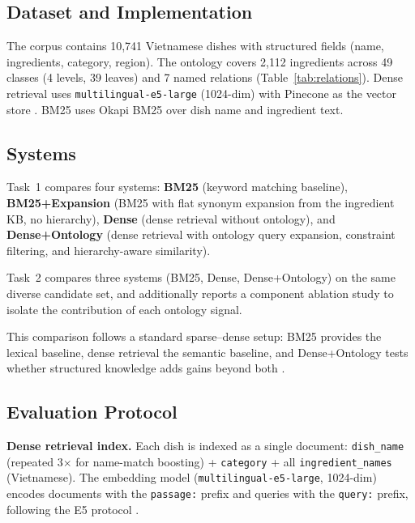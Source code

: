 \label{sec:experiments}

\subsection{Dataset and Implementation}

The corpus contains 10{,}741 Vietnamese dishes with structured fields (name, ingredients, category, region). The ontology covers 2{,}112 ingredients across 49 classes (4 levels, 39 leaves) and 7 named relations (Table~\ref{tab:relations}). Dense retrieval uses \texttt{multilingual-e5-large} (1024-dim) with Pinecone as the vector store \cite{wang2024multilinguale5}. BM25 uses Okapi BM25 over dish name and ingredient text.

\subsection{Systems}

Task~1 compares four systems: \textbf{BM25} (keyword matching 
baseline), \textbf{BM25+Expansion} (BM25 with flat synonym expansion from the ingredient KB, no hierarchy), \textbf{Dense} (dense retrieval without ontology), and \textbf{Dense+Ontology} 
(dense retrieval with ontology query expansion, constraint filtering, and hierarchy-aware similarity). 

Task~2 compares three systems (BM25, Dense, Dense+Ontology) on the same diverse candidate set, and additionally reports a component ablation study to isolate the contribution of each ontology signal.


This comparison follows a standard sparse--dense setup: BM25 provides the lexical baseline, dense retrieval the semantic baseline, and Dense+Ontology tests whether structured knowledge 
adds gains beyond both \cite{robertson2009probabilistic, 
karpukhin2020dense, thakur2021beir}.
\subsection{Evaluation Protocol}
\label{ssec:eval_protocol}

\textbf{Dense retrieval index.}
Each dish is indexed as a single document: \texttt{dish\_name} (repeated 3$\times$ for name-match boosting) + \texttt{category} + all \texttt{ingredient\_names} (Vietnamese). The embedding model (\texttt{multilingual-e5-large}, 1024-dim) encodes documents with the \texttt{passage:} prefix and queries with the \texttt{query:} prefix, following the E5 protocol \cite{wang2024multilinguale5}.

